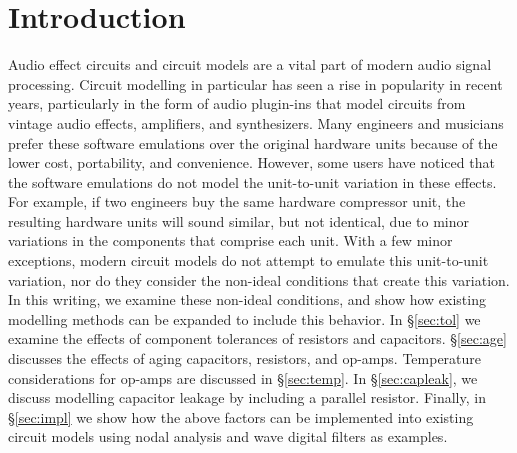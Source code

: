 \documentclass[twoside,a4paper]{article}
\title{\papertitle}
\affiliation{
\paperauthorA \, }
{\href{http://ccrma.stanford.edu}{Center for Computer Research in Music and Acoustics} \\ Stanford University \\ Palo Alto, CA \\ {\tt \href{mailto:jatin@ccrma.stanford.edu}{jatin@ccrma.stanford.edu}}}
\newif\ifpdf
\begin{document}
\ifpdf %
  \DeclareGraphicsExtensions{.png,.jpg,.pdf}
\else  %
\fi

\maketitle
%
\begin{abstract}
Traditional circuit modelling methods typically assume ideal
circuit components. Real world audio circuits exhibit
variations in behavior due to non-ideal factors including
component tolerances, operating temperature, and aging.
We present a brief discussion of each of these non-ideal
factors for resistors, capacitors, and operational amplifiers
(op-amps), and show how they each individually affect the
behavior of a circuit model. We present models of Sallen-Key
lowpass filter and diode clipper circuits that incorporate all
of the non-ideal factors together.
\end{abstract}

\section{Introduction} \label{sec:intro}
%
Audio effect circuits and circuit models are a vital part
of modern audio signal processing. Circuit modelling in
particular has seen a rise in popularity in recent years,
particularly in the form of audio plugin-ins that model
circuits from vintage audio effects, amplifiers, and synthesizers.
Many engineers and musicians prefer these software emulations over
the original hardware units because of the lower cost, portability,
and convenience. However, some users have noticed that the software
emulations do not model the unit-to-unit variation in these effects.
For example, if two engineers buy the same hardware compressor unit,
the resulting hardware units will sound similar, but not identical,
due to minor variations in the components that comprise each unit.
With a few minor exceptions, modern circuit models do not attempt to
emulate this unit-to-unit variation, nor do they consider the non-ideal
conditions that create this variation.
\newline\newline
In this writing, we examine these non-ideal conditions, and show how
existing modelling methods can be expanded to include this behavior.
In \S\ref{sec:tol} we examine the effects of component tolerances of resistors
and capacitors. \S\ref{sec:age} discusses the effects of aging capacitors,
resistors, and op-amps. Temperature considerations for
op-amps are discussed in \S\ref{sec:temp}. In \S\ref{sec:capleak}, we
discuss modelling capacitor leakage by including a parallel resistor.
Finally, in \S\ref{sec:impl} we show how the above factors can be
implemented into existing circuit models using nodal analysis and wave
digital filters as examples.
\end{document}
